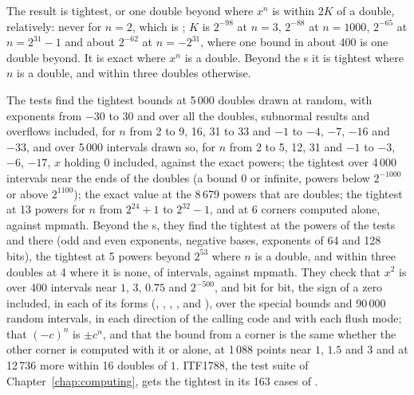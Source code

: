 The result is tightest, or one double beyond where $x^n$ is within $2K$ of
a double, relatively: never for $n=2$, which is ; $K$ is
$2^{-98}$ at $n=3$, $2^{-88}$ at $n=1000$, $2^{-65}$ at $n=2^{31}-1$ and
about $2^{-62}$ at $n=-2^{31}$, where one bound in about 400 is one double
beyond. It is exact where $x^n$ is a double. Beyond the s it is
tightest where $n$ is a double, and within three doubles otherwise.

The tests find the tightest bounds at 5\,000 doubles drawn at random, with
exponents from $-30$ to $30$ and over all the doubles, subnormal results and
overflows included, for $n$ from 2 to 9, 16, 31 to 33 and $-1$ to $-4$,
$-7$, $-16$ and $-33$, and over 5\,000 intervals drawn so, for $n$ from 2
to 5, 12, 31 and $-1$ to $-3$, $-6$, $-17$, $x$ holding $0$ included,
against the exact powers; the tightest over 4\,000 intervals near the ends
of the doubles (a bound $0$ or infinite, powers below $2^{-1000}$ or above
$2^{1100}$); the exact value at the 8\,679 powers that are doubles; the
tightest at 13 powers for $n$ from $2^{24}+1$ to $2^{32}-1$, and at 6
corners computed alone, against mpmath. Beyond the s, they find
the tightest at the powers of the tests  and
 there (odd and even exponents, negative bases, exponents of
64 and 128 bits), the tightest at 5 powers beyond $2^{53}$ where $n$ is a
double, and within three doubles at 4 where it is none, of intervals,
against mpmath. They check that $x^2$ is  over
400 intervals near $1$, $3$, $0.75$ and $2^{-500}$, and bit for bit, the
sign of a zero included, in each of its forms (,
, , \code{[2]},  and
), over the special bounds and 90\,000 random intervals,
in each direction of the calling code and with each flush mode; that
$(-c)^n$ is $\pm c^n$, and that the bound from a corner is the same whether
the other corner is computed with it or alone, at 1\,088 points near $1$,
$1.5$ and $3$ and at 12\,736 more within 16 doubles of $1$. ITF1788, the
test suite of Chapter~\ref{chap:computing}, gets the tightest in its 163
cases of .

